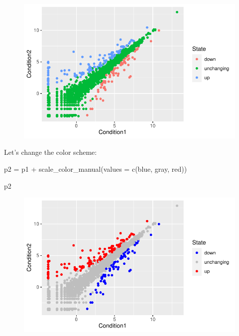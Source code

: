 \documentclass[
  letterpaper,
  DIV=11,
  numbers=noendperiod]{scrartcl}
\newenvironment{Shaded}{\begin{snugshade}}{\end{snugshade}}
\newcommand{\AttributeTok}[1]{\textcolor[rgb]{0.40,0.45,0.13}{#1}}
\newcommand{\FunctionTok}[1]{\textcolor[rgb]{0.28,0.35,0.67}{#1}}
\newcommand{\NormalTok}[1]{\textcolor[rgb]{0.00,0.23,0.31}{#1}}
\newcommand{\OtherTok}[1]{\textcolor[rgb]{0.00,0.23,0.31}{#1}}
\newcommand{\SpecialCharTok}[1]{\textcolor[rgb]{0.37,0.37,0.37}{#1}}
\newcommand{\StringTok}[1]{\textcolor[rgb]{0.13,0.47,0.30}{#1}}
\begin{document}
\begin{figure}[H]

{\centering \includegraphics{class05_files/figure-pdf/unnamed-chunk-11-1.pdf}

}

\end{figure}

Let's change the color scheme:

\begin{Shaded}
\begin{Highlighting}[]
\NormalTok{p2 }\OtherTok{=}\NormalTok{ p1 }\SpecialCharTok{+} \FunctionTok{scale\_color\_manual}\NormalTok{(}\AttributeTok{values =} \FunctionTok{c}\NormalTok{(}\StringTok{\textquotesingle{}blue\textquotesingle{}}\NormalTok{, }\StringTok{\textquotesingle{}gray\textquotesingle{}}\NormalTok{, }\StringTok{\textquotesingle{}red\textquotesingle{}}\NormalTok{))}

\NormalTok{p2}
\end{Highlighting}
\end{Shaded}

\begin{figure}[H]

{\centering \includegraphics{class05_files/figure-pdf/unnamed-chunk-12-1.pdf}

}

\end{figure}
\end{document}

